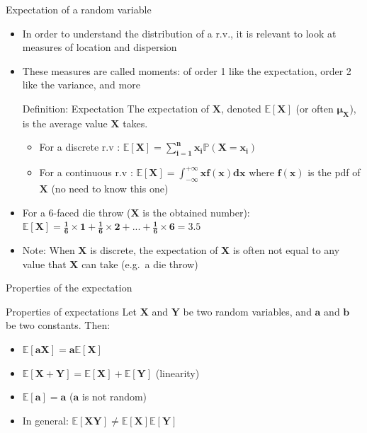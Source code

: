 \documentclass[
  ignorenonframetext,
  aspectratio=169]{beamer}
\providecommand{\tightlist}{%
  \setlength{\itemsep}{0pt}\setlength{\parskip}{0pt}}
\begin{document}
\begin{frame}{Expectation of a random variable}
\protect\hypertarget{expectation-of-a-random-variable}{}
\label{moment}

\begin{itemize}
\tightlist
\item
  In order to understand the distribution of a r.v., it is relevant to
  look at measures of location and dispersion
\item
  These measures are called moments: of order 1 like the expectation,
  order 2 like the variance, and more

  \begin{block}{Definition: Expectation}
  The expectation of $\bm{X}$, denoted $\bm{\mathbb{E}[X]}$ (or often $\bm{\mu_X}$), is the average value $\bm{X}$ takes.
  \begin{itemize}
  \item For a discrete r.v : $\bm{\mathbb{E}[X] = \sum_{i = 1}^{n}x_i\mathbb{P}(X = x_i)}$
  \item For a continuous r.v : $\bm{\mathbb{E}[X] = \int_{-\infty}^{+\infty}xf(x)dx}$ where $\bm{f(x)}$ is the pdf of $\bm{X}$ (no need to know this one)
  \end{itemize}
  \end{block}
\item
  For a 6-faced die throw (\(\bm{X}\) is the obtained number):
  \(\bm{\mathbb{E}[X]=\frac{1}{6}\times 1 + \frac{1}{6}\times 2 + ... + \frac{1}{6}\times 6= 3.5}\)
\item
  Note: When \(\bm{X}\) is discrete, the expectation of \(\bm{X}\) is
  often not equal to any value that \(\bm{X}\) can take (e.g.~a die
  throw)
\end{itemize}
\end{frame}

\begin{frame}{Properties of the expectation}
\protect\hypertarget{properties-of-the-expectation}{}
\begin{block}{Properties of expectations}
Let $\bm{X}$ and $\bm{Y}$ be two random variables, and $\bm{a}$ and $\bm{b}$ be two constants. Then:
\begin{itemize}
\item $\bm{\mathbb{E}[aX] = a\mathbb{E}[X]}$ 
\item $\bm{\mathbb{E}[X + Y] = \mathbb{E}[X] + \mathbb{E}[Y]}$ (linearity)
\item $\bm{\mathbb{E}[a] = a}$ ($\bm{a}$ is not random)
\item In general: $\bm{\mathbb{E}[XY]\neq \mathbb{E}[X]\mathbb{E}[Y]}$
\end{itemize}
\end{block}
\end{frame}
\end{document}
